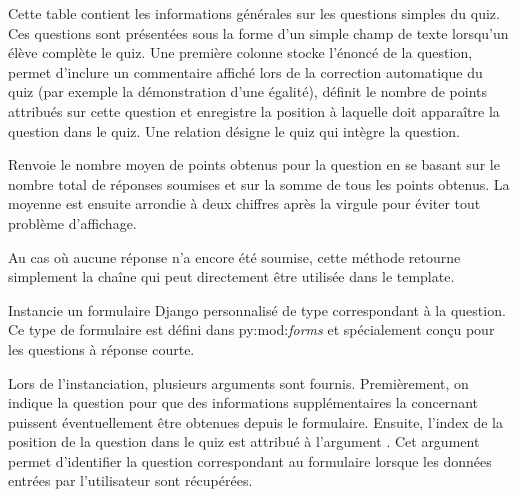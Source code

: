 \documentclass[a4paper,11pt,openany,oneside]{sphinxmanual}
\begin{document}
\begin{fulllineitems}
\label{database:quiz.models.SimpleQuestion}
Cette table contient les informations générales sur les questions simples du quiz.
Ces questions sont présentées sous la forme d'un simple champ de texte lorsqu'un
élève complète le quiz. Une première colonne  stocke l'énoncé de la
question,  permet d'inclure un commentaire affiché lors de la
correction automatique du quiz (par exemple la démonstration d'une égalité),
 définit le nombre de points attribués sur cette question et 
enregistre la position à laquelle doit apparaître la question dans le quiz. Une relation
désigne le quiz qui intègre la question.

\begin{fulllineitems}
\label{database:quiz.models.SimpleQuestion.average_result}
Renvoie le nombre moyen de points obtenus pour la question en se basant sur
le nombre total de réponses soumises et sur la somme de tous les points obtenus.
La moyenne est ensuite arrondie à deux chiffres après la virgule pour éviter
tout problème d'affichage.

Au cas où aucune réponse n'a encore été soumise, cette méthode retourne
simplement la chaîne \code{-{-}} qui peut directement être utilisée dans le template.

\end{fulllineitems}


\begin{fulllineitems}
\label{database:quiz.models.SimpleQuestion.create_form}
Instancie un formulaire Django personnalisé de type  correspondant
à la question. Ce type de formulaire est défini dans py:mod:\emph{forms} et spécialement
conçu pour les questions à réponse courte.

Lors de l'instanciation, plusieurs arguments sont fournis. Premièrement,
on indique la question  pour que des informations supplémentaires
la concernant puissent éventuellement être obtenues depuis le formulaire.
Ensuite, l'index de la position de la question dans le quiz est attribué à
l'argument . Cet argument permet d'identifier la question correspondant
au formulaire lorsque les données entrées par l'utilisateur sont récupérées.


\end{fulllineitems}
\end{fulllineitems}
\end{document}
